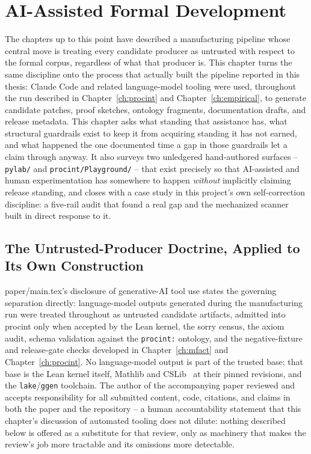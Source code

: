 \chapter{AI-Assisted Formal Development}
\label{ch:ai-development}

The chapters up to this point have described a manufacturing pipeline
whose central move is treating every candidate producer as untrusted
with respect to the formal corpus, regardless of what that producer is.
This chapter turns the same discipline onto the process that actually
built the pipeline reported in this thesis: Claude Code and related
language-model tooling were used, throughout the run described in
Chapter~\ref{ch:procint} and Chapter~\ref{ch:empirical}, to generate
candidate patches, proof sketches, ontology fragments, documentation
drafts, and release metadata. This chapter asks what standing that
assistance has, what structural guardrails exist to keep it from
acquiring standing it has not earned, and what happened the one
documented time a gap in those guardrails let a claim through anyway.
It also surveys two unledgered hand-authored surfaces --
\texttt{pylab/} and \texttt{procint/Playground/} -- that exist
precisely so that AI-assisted and human experimentation has somewhere
to happen \emph{without} implicitly claiming release standing, and
closes with a case study in this project's own self-correction
discipline: a five-rail audit that found a real gap and the mechanized
scanner built in direct response to it.

\section{The Untrusted-Producer Doctrine, Applied to Its Own Construction}
\label{sec:ai-doctrine}

paper/main.tex's disclosure of generative-AI tool use states the
governing separation directly: language-model outputs generated during
the manufacturing run were treated throughout as untrusted candidate
artifacts, admitted into \textsf{procint} only when accepted by the Lean
kernel, the sorry census, the axiom audit, schema validation against the
\texttt{procint:} ontology, and the negative-fixture and release-gate
checks developed in Chapter~\ref{ch:mfact} and Chapter~\ref{ch:procint}.
No language-model output is part of the trusted base; that base is the
Lean kernel itself, Mathlib and CSLib~\cite{mathlib2020,cslib2026} at
their pinned revisions, and the \texttt{lake}/\texttt{ggen} toolchain.
The author of the accompanying paper reviewed and accepts responsibility
for all submitted content, code, citations, and claims in both the paper
and the repository -- a human accountability statement that this
chapter's discussion of automated tooling does not dilute: nothing
described below is offered as a substitute for that review, only as
machinery that makes the review's job more tractable and its omissions
more detectable.

